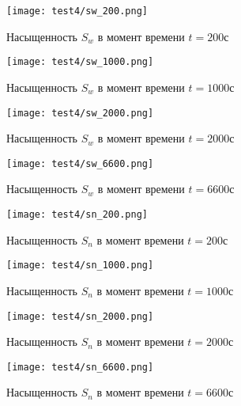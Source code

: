\begin{figure}
  \begin{center}
    \begin{minipage}[h]{0.49\textwidth}
       \texttt{[image: test4/sw\_200.png]} 
       \caption{Насыщенность $S_w$ в момент времени $t=200$с}
    \end{minipage}
    \hfill
    \begin{minipage}[h]{0.49\textwidth}
       \texttt{[image: test4/sw\_1000.png]} 
       \caption{Насыщенность $S_w$ в момент времени $t=1000$с}
    \end{minipage}
    \vfill
    \begin{minipage}[h]{0.49\textwidth}
       \texttt{[image: test4/sw\_2000.png]} 
       \caption{Насыщенность $S_w$ в момент времени $t=2000$с}
    \end{minipage}
    \hfill
    \begin{minipage}[h]{0.49\textwidth}
       \texttt{[image: test4/sw\_6600.png]} 
       \caption{Насыщенность $S_w$ в момент времени $t=6600$с}
    \end{minipage}
    \hfill  
  \end{center}
\end{figure}

\begin{figure}
  \begin{center}
    \begin{minipage}[h]{0.49\textwidth}
       \texttt{[image: test4/sn\_200.png]} 
       \caption{Насыщенность $S_n$ в момент времени $t=200$с}
    \end{minipage}
    \hfill
    \begin{minipage}[h]{0.49\textwidth}
       \texttt{[image: test4/sn\_1000.png]} 
       \caption{Насыщенность $S_n$ в момент времени $t=1000$с}
    \end{minipage}
    \vfill
    \begin{minipage}[h]{0.49\textwidth}
       \texttt{[image: test4/sn\_2000.png]} 
       \caption{Насыщенность $S_n$ в момент времени $t=2000$с}
    \end{minipage}
    \hfill
    \begin{minipage}[h]{0.49\textwidth}
       \texttt{[image: test4/sn\_6600.png]} 
       \caption{Насыщенность $S_n$ в момент времени $t=6600$с}
    \end{minipage}
    \hfill  
  \end{center}
\end{figure}

